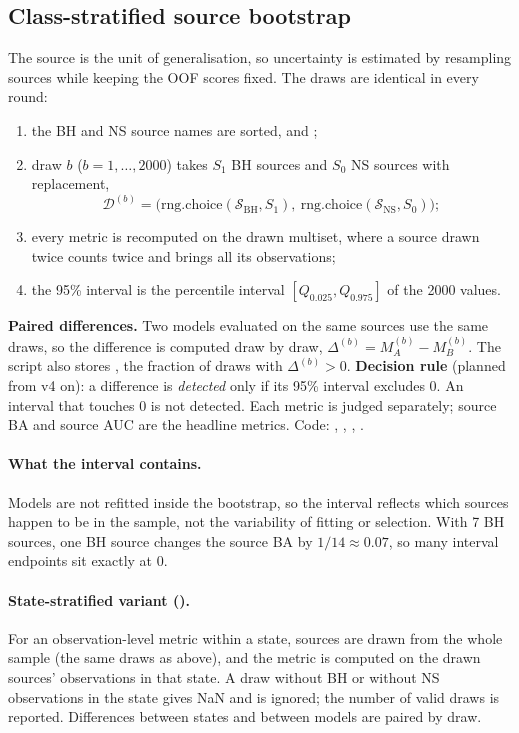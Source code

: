 \subsection{Class-stratified source bootstrap}\label{sec:bootstrap}
The source is the unit of generalisation, so uncertainty is estimated by resampling sources while keeping the OOF scores
fixed. The draws are identical in every round:
\begin{enumerate}
\item the BH and NS source names are sorted, and ;
\item draw $b$ ($b=1,\dots,2000$) takes $S_1$ BH sources and $S_0$ NS sources with replacement,
\[
\mathcal D^{(b)}=\bigl(\mathrm{rng.choice}(\mathcal S_\mathrm{BH},S_1),\ \mathrm{rng.choice}(\mathcal S_\mathrm{NS},S_0)\bigr);
\]
\item every metric is recomputed on the drawn multiset, where a source drawn twice counts twice and brings all its
observations;
\item the 95\% interval is the percentile interval $[Q_{0.025},Q_{0.975}]$ of the 2000 values.
\end{enumerate}
\textbf{Paired differences.} Two models evaluated on the same sources use the same draws, so the difference is computed
draw by draw, $\Delta^{(b)}=M_A^{(b)}-M_B^{(b)}$. The script also stores , the fraction of draws with
$\Delta^{(b)}>0$. \textbf{Decision rule} (planned from v4 on): a difference is \emph{detected} only if its 95\% interval
excludes 0. An interval that touches 0 is not detected. Each metric is judged separately; source BA and source AUC are the
headline metrics. Code: , , ,
.

\paragraph{What the interval contains.} Models are not refitted inside the bootstrap, so the interval reflects which sources
happen to be in the sample, not the variability of fitting or selection. With 7 BH sources, one BH source changes the source
BA by $1/14\approx0.07$, so many interval endpoints sit exactly at 0.

\paragraph{State-stratified variant ().} For an observation-level metric within a state, sources are
drawn from the whole sample (the same draws as above), and the metric is computed on the drawn sources' observations in that
state. A draw without BH or without NS observations in the state gives NaN and is ignored; the number of valid draws is
reported. Differences between states and between models are paired by draw.

